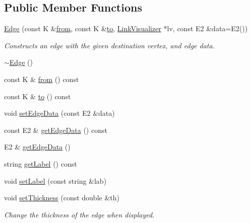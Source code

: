 \subsection*{Public Member Functions}
\begin{DoxyCompactItemize}
\item 
\mbox{\hyperlink{classbridges_1_1datastructure_1_1_edge_aae44cef647b20d260b449a5fb041ae95}{Edge}} (const K \&\mbox{\hyperlink{classbridges_1_1datastructure_1_1_edge_a0fba8af11c12f73c993f6e8a573daa02}{from}}, const K \&\mbox{\hyperlink{classbridges_1_1datastructure_1_1_edge_a2cece2762a29e3fc18859e0c725eee82}{to}}, \mbox{\hyperlink{classbridges_1_1datastructure_1_1_link_visualizer}{Link\+Visualizer}} $\ast$lv, const E2 \&data=E2())
\begin{DoxyCompactList}\small\item\em Constructs an edge with the given destination vertex, and edge data. \end{DoxyCompactList}\item 
\mbox{\hyperlink{classbridges_1_1datastructure_1_1_edge_a7160632622b92c93036cd6fdcec75959}{$\sim$\+Edge}} ()
\item 
const K \& \mbox{\hyperlink{classbridges_1_1datastructure_1_1_edge_a0fba8af11c12f73c993f6e8a573daa02}{from}} () const
\item 
const K \& \mbox{\hyperlink{classbridges_1_1datastructure_1_1_edge_a2cece2762a29e3fc18859e0c725eee82}{to}} () const
\item 
void \mbox{\hyperlink{classbridges_1_1datastructure_1_1_edge_a8f030413780f15f90141e4ff29240ec0}{set\+Edge\+Data}} (const E2 \&data)
\item 
const E2 \& \mbox{\hyperlink{classbridges_1_1datastructure_1_1_edge_a4769b5d8fc74522f77f5927b230ced7b}{get\+Edge\+Data}} () const
\item 
E2 \& \mbox{\hyperlink{classbridges_1_1datastructure_1_1_edge_a302b605a5d30387cfae8f4805c43ec41}{get\+Edge\+Data}} ()
\item 
string \mbox{\hyperlink{classbridges_1_1datastructure_1_1_edge_aad4a9a28e282e5aa5e7821a14ef94327}{get\+Label}} () const
\item 
void \mbox{\hyperlink{classbridges_1_1datastructure_1_1_edge_a5f88c4db54027da70de06f21fd5b6ccd}{set\+Label}} (const string \&lab)
\item 
void \mbox{\hyperlink{classbridges_1_1datastructure_1_1_edge_adf4a6a3974e1fc60331f4b9d33c7b0e5}{set\+Thickness}} (const double \&th)
\begin{DoxyCompactList}\small\item\em Change the thickness of the edge when displayed. \end{DoxyCompactList}\item 

\end{DoxyCompactItemize}
